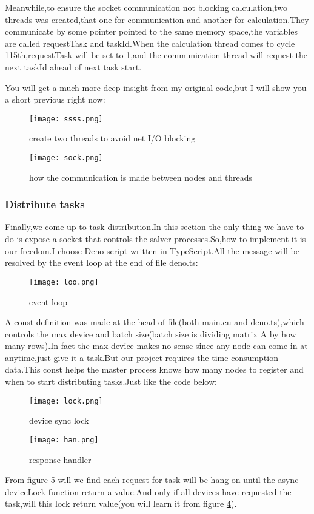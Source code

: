 \documentclass[12pt]{scrartcl} %
\begin{document}
Meanwhile,to ensure the socket communication not blocking calculation,two threads was created,that one for communication and another for calculation.They communicate by some pointer pointed to the same memory space,the variables are called requestTask and taskId.When the calculation thread comes to cycle 115th,requestTask will be set to 1,and the communication thread will request the next taskId ahead of next task start.

You will get a much more deep insight from my original code,but I will show you a short previous right now:
\begin{figure}[H]
    \centering
    \texttt{[image: ssss.png]}
    \caption{create two threads to avoid net I/O blocking}
    \label{}
\end{figure}
\begin{figure}[H]
    \centering
    \texttt{[image: sock.png]}
    \caption{how the communication is made between nodes and threads}
    \label{}
\end{figure}
\subsubsection{Distribute tasks}
Finally,we come up to task distribution.In this section the only thing we have to do is expose a socket that controls the salver processes.So,how to implement it is our freedom.I choose Deno script written in TypeScript.All the message will be resolved by the event loop at the end of file deno.ts:
\begin{figure}[H]
    \centering
    \texttt{[image: loo.png]}
    \caption{event loop}
    \label{}
\end{figure}

A const definition was made at the head of file(both main.cu and deno.ts),which controls the max device and batch size(batch size is dividing matrix A by how many rows).In fact the max device makes no sense since any node can come in at anytime,just give it a task.But our project requires the time consumption data.This const helps the master process knows how many nodes to register and when to start distributing tasks.Just like the code below:
\begin{figure}[H]
    \centering
    \texttt{[image: lock.png]}
    \caption{device sync lock}
    \label{dd}
\end{figure}
\begin{figure}[H]
    \centering
    \texttt{[image: han.png]}
    \caption{response handler}
    \label{rr}
\end{figure}
From figure \ref{rr} will we find each request for task will be hang on until the async deviceLock function return a value.And only if all devices have requested the task,will this lock return value(you will learn it from figure \ref{dd}).
\end{document}
